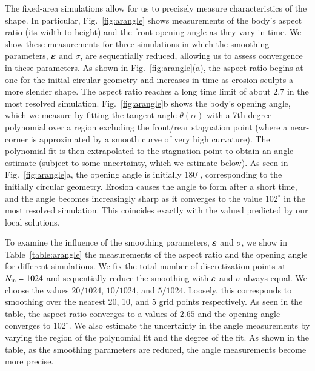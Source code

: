\documentclass[preprint, 10pt]{elsarticle}
\begin{document}
The fixed-area simulations allow for us to precisely measure characteristics of the shape. In particular, Fig.~\ref{fig:arangle} shows measurements of the body's aspect ratio (its width to height) and the front opening angle as they vary in time. We show these measurements for three simulations in which the smoothing parameters, $\varepsilon$ and $\sigma$, are sequentially reduced, allowing us to assess convergence in these parameters. As shown in Fig.~\ref{fig:arangle}(a), the aspect ratio begins at one for the initial circular geometry and increases in time as erosion sculpts a more slender shape. The aspect ratio reaches a long time limit of about 2.7 in the most resolved simulation. Fig.~\ref{fig:arangle}b shows the body's opening angle, which we measure by fitting the tangent angle $\theta(\alpha)$ with a 7th degree polynomial over a region excluding the front/rear stagnation point (where a near-corner is approximated by a smooth curve of very high curvature). The polynomial fit is then extrapolated to the stagnation point to obtain an angle estimate (subject to some uncertainty, which we estimate below). As seen in Fig.~\ref{fig:arangle}a, the opening angle is initially $180^\circ$, corresponding to the initially circular geometry. Erosion causes the angle to form after a short time, and the angle becomes increasingly sharp as it converges to the value $102^\circ$ in the most resolved simulation. This coincides exactly with the valued predicted by our local solutions.

To examine the influence of the smoothing parameters, $\varepsilon$ and
$\sigma$, we show in Table~\ref{table:arangle} the measurements of the
aspect ratio and the opening angle for different simulations. We fix the total number of discretization points at $N_{\mathrm{in}} = 1024$ and sequentially reduce the smoothing with $\varepsilon$ and $\sigma$ always equal. We choose the values $20/1024$, $10/1024$, and $5/1024$. 
Loosely, this corresponds to smoothing over the nearest 20, 10, and 5 grid points respectively. As seen in the table, the aspect ratio converges to a values of $2.65$ and the opening angle converges to $102^{\circ}$. We also estimate the uncertainty in the angle measurements by varying the region of the polynomial fit and the degree of the fit. As shown in the table, as the smoothing parameters are reduced, the angle measurements become more precise.
\end{document}
